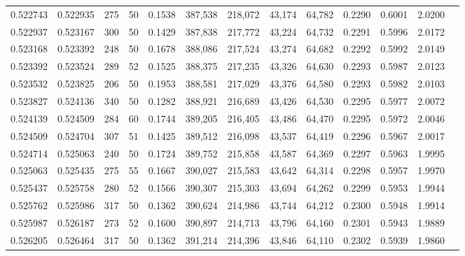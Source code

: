 \begin{tabular}{rrrrrrrrrrrrr}
0.522743 & 0.522935 &   275 &  50 &                                     0.1538 & 387,538 & 218,072 &  43,174 &  64,782 & 0.2290 & 0.6001 & 2.0200 \\
0.522937 & 0.523167 &   300 &  50 &                                     0.1429 & 387,838 & 217,772 &  43,224 &  64,732 & 0.2291 & 0.5996 & 2.0172 \\
0.523168 & 0.523392 &   248 &  50 &                                     0.1678 & 388,086 & 217,524 &  43,274 &  64,682 & 0.2292 & 0.5992 & 2.0149 \\
0.523392 & 0.523524 &   289 &  52 &                                     0.1525 & 388,375 & 217,235 &  43,326 &  64,630 & 0.2293 & 0.5987 & 2.0123 \\
0.523532 & 0.523825 &   206 &  50 &                                     0.1953 & 388,581 & 217,029 &  43,376 &  64,580 & 0.2293 & 0.5982 & 2.0103 \\
0.523827 & 0.524136 &   340 &  50 &                                     0.1282 & 388,921 & 216,689 &  43,426 &  64,530 & 0.2295 & 0.5977 & 2.0072 \\
0.524139 & 0.524509 &   284 &  60 &                                     0.1744 & 389,205 & 216,405 &  43,486 &  64,470 & 0.2295 & 0.5972 & 2.0046 \\
0.524509 & 0.524704 &   307 &  51 &                                     0.1425 & 389,512 & 216,098 &  43,537 &  64,419 & 0.2296 & 0.5967 & 2.0017 \\
0.524714 & 0.525063 &   240 &  50 &                                     0.1724 & 389,752 & 215,858 &  43,587 &  64,369 & 0.2297 & 0.5963 & 1.9995 \\
0.525063 & 0.525435 &   275 &  55 &                                     0.1667 & 390,027 & 215,583 &  43,642 &  64,314 & 0.2298 & 0.5957 & 1.9970 \\
0.525437 & 0.525758 &   280 &  52 &                                     0.1566 & 390,307 & 215,303 &  43,694 &  64,262 & 0.2299 & 0.5953 & 1.9944 \\
0.525762 & 0.525986 &   317 &  50 &                                     0.1362 & 390,624 & 214,986 &  43,744 &  64,212 & 0.2300 & 0.5948 & 1.9914 \\
0.525987 & 0.526187 &   273 &  52 &                                     0.1600 & 390,897 & 214,713 &  43,796 &  64,160 & 0.2301 & 0.5943 & 1.9889 \\
0.526205 & 0.526464 &   317 &  50 &                                     0.1362 & 391,214 & 214,396 &  43,846 &  64,110 & 0.2302 & 0.5939 & 1.9860 \\

\end{tabular}
